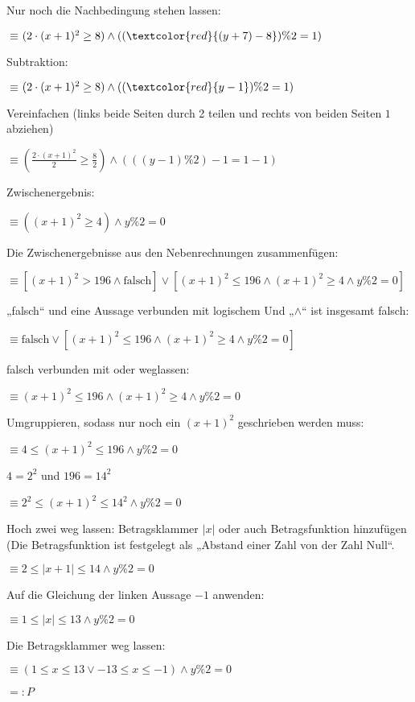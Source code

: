 \documentclass{lehramt-informatik}
\def\MatheEnv#1{
  \medskip

  \hspace{2em}#1

  \medskip
}
\def\Mathe#1{
  \MatheEnv{$#1$}
}
\def\MatheEquiv#1{
  \MatheEnv{$\equiv$\hspace{2em}$#1$}
}
\def\Erklaerung#1{
  \medskip
  {\footnotesize#1}
}
\begin{document}
\begin{antwort}
\Erklaerung{Nur noch die Nachbedingung stehen lassen:}

\MatheEquiv{
  (2 \cdot (x + 1)^2 \geq 8) \land ((\textcolor{red}{(y + 7) - 8}) \% 2 = 1)
}

\Erklaerung{Subtraktion:}

\MatheEquiv{
  (2 \cdot (x + 1)^2 \geq 8) \land ((\textcolor{red}{y - 1}) \% 2 = 1)
}

\Erklaerung{Vereinfachen (links beide Seiten durch 2 teilen und rechts
von beiden Seiten $1$ abziehen)}

\MatheEquiv{
  (\frac{2 \cdot (x + 1)^2}{2} \geq \frac{8}{2}) \land (((y - 1) \% 2) - 1 = 1 - 1)
}

\Erklaerung{Zwischenergebnis:}

\MatheEquiv{
((x + 1)^2 \geq 4) \land y \% 2 = 0
}

\vspace{1cm}


\Erklaerung{Die Zwischenergebnisse aus den Nebenrechnungen
zusammenfügen:}

\MatheEquiv{
  [
    (x + 1)^2 > 196 \land
    \text{falsch}
  ]
  \lor
  [
    (x + 1)^2 \leq 196 \land
    (x + 1)^2 \geq 4 \land y\%2 = 0
  ]
}

\Erklaerung{„falsch“ und eine Aussage verbunden mit logischem Und
„$\land$“ ist insgesamt falsch:}

\MatheEquiv{
  \text{falsch}
  \lor
  [
    (x + 1)^2 \leq 196 \land
    (x + 1)^2 \geq 4 \land y\%2 = 0
  ]
}

\Erklaerung{falsch verbunden mit oder weglassen:}

\MatheEquiv{
  (x + 1)^2 \leq 196
  \land
  (x + 1)^2 \geq 4 \land y\%2 = 0
}

\Erklaerung{Umgruppieren, sodass nur noch ein $(x + 1)^2$ geschrieben
werden muss:}

\MatheEquiv{
  4 \leq (x + 1)^2 \leq 196
  \land
  y\%2 = 0
}

$4 = 2^2$ und $196 = 14^2$

\MatheEquiv{
  2^2 \leq (x + 1)^2 \leq 14^2
  \land
  y\%2 = 0
}

\Erklaerung{Hoch zwei weg lassen: Betragsklammer $|x|$ oder auch
Betragsfunktion hinzufügen (Die Betragsfunktion ist festgelegt als
„Abstand einer Zahl von der Zahl Null“.}

\MatheEquiv{
  2 \leq | x + 1 | \leq 14 \land y\%2 = 0
}

\Erklaerung{Auf die Gleichung der linken Aussage $-1$ anwenden:}

\MatheEquiv{
  1 \leq |x| \leq 13 \land y\%2 = 0
}

\Erklaerung{Die Betragsklammer weg lassen:}

\MatheEquiv{
  (1 \leq x \leq 13 \lor -13 \leq x \leq -1) \land y\%2 = 0
}

\Mathe{=: P}

\end{antwort}
\end{document}
